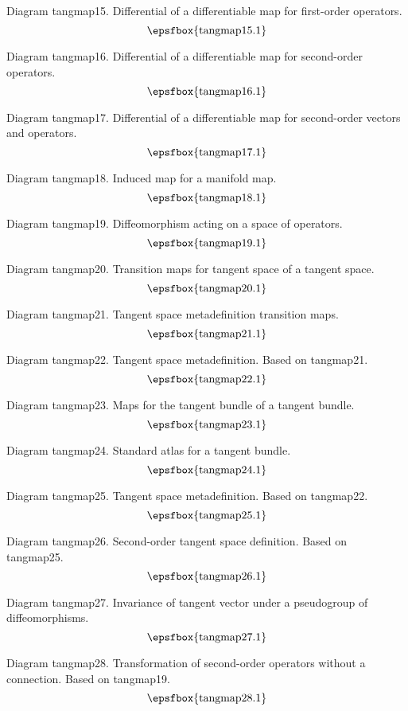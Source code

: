 Diagram tangmap15. Differential of a differentiable map for first-order
operators.
$$
\centerline{\epsfbox{tangmap15.1}}
$$

Diagram tangmap16. Differential of a differentiable map for second-order
operators.
$$
\centerline{\epsfbox{tangmap16.1}}
$$

\filleject

Diagram tangmap17. Differential of a differentiable map for second-order vectors
and operators.
$$
\centerline{\epsfbox{tangmap17.1}}
$$

Diagram tangmap18. Induced map for a manifold map.
$$
\centerline{\epsfbox{tangmap18.1}}
$$

Diagram tangmap19. Diffeomorphism acting on a space of operators.
$$
\centerline{\epsfbox{tangmap19.1}}
$$

Diagram tangmap20. Transition maps for tangent space of a tangent space.
$$
\centerline{\epsfbox{tangmap20.1}}
$$

\filleject

Diagram tangmap21. Tangent space metadefinition transition maps.
$$
\centerline{\epsfbox{tangmap21.1}}
$$

Diagram tangmap22. Tangent space metadefinition. Based on tangmap21.
$$
\centerline{\epsfbox{tangmap22.1}}
$$

Diagram tangmap23. Maps for the tangent bundle of a tangent bundle.
$$
\centerline{\epsfbox{tangmap23.1}}
$$

Diagram tangmap24. Standard atlas for a tangent bundle.
$$
\centerline{\epsfbox{tangmap24.1}}
$$

\filleject

Diagram tangmap25. Tangent space metadefinition. Based on tangmap22.
$$
\centerline{\epsfbox{tangmap25.1}}
$$

Diagram tangmap26. Second-order tangent space definition. Based on tangmap25.
$$
\centerline{\epsfbox{tangmap26.1}}
$$

Diagram tangmap27. Invariance of tangent vector under a pseudogroup of
diffeomorphisms.
$$
\centerline{\epsfbox{tangmap27.1}}
$$

Diagram tangmap28. Transformation of second-order operators without a
connection. Based on tangmap19.
$$
\centerline{\epsfbox{tangmap28.1}}
$$

\filleject

